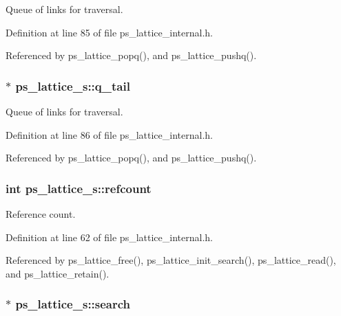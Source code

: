 Queue of links for traversal. 



Definition at line 85 of file ps\+\_\+lattice\+\_\+internal.\+h.



Referenced by ps\+\_\+lattice\+\_\+popq(), and ps\+\_\+lattice\+\_\+pushq().

\subsubsection[{q\+\_\+tail}]{$\ast$ ps\+\_\+lattice\+\_\+s\+::q\+\_\+tail}\label{structps__lattice__s_a5a9faf5e4aabd84a868d1bff97dd9814}


Queue of links for traversal. 



Definition at line 86 of file ps\+\_\+lattice\+\_\+internal.\+h.



Referenced by ps\+\_\+lattice\+\_\+popq(), and ps\+\_\+lattice\+\_\+pushq().

\subsubsection[{refcount}]{\setlength{\rightskip}{0pt plus 5cm}int ps\+\_\+lattice\+\_\+s\+::refcount}\label{structps__lattice__s_a6d66b392dec016b3304da2f53be17dd1}


Reference count. 



Definition at line 62 of file ps\+\_\+lattice\+\_\+internal.\+h.



Referenced by ps\+\_\+lattice\+\_\+free(), ps\+\_\+lattice\+\_\+init\+\_\+search(), ps\+\_\+lattice\+\_\+read(), and ps\+\_\+lattice\+\_\+retain().

\subsubsection[{search}]{$\ast$ ps\+\_\+lattice\+\_\+s\+::search}\label{structps__lattice__s_a9ebaeb7be7a83980569f0c544eb6babb}


